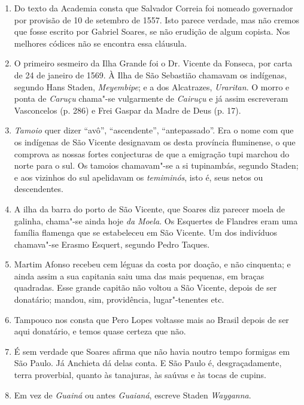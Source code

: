 \begin{enumerate}
\item Do texto da Academia consta que Salvador Correia foi nomeado governador por 
provisão de 10 de setembro de 1557. Isto parece verdade, mas não cremos que fosse 
escrito por Gabriel Soares, se não erudição de algum copista. Nos melhores códices 
não se encontra essa cláusula.

\item O primeiro sesmeiro da Ilha Grande foi o Dr. Vicente da Fonseca, por carta de 24 de 
janeiro de 1569.
À Ilha de São Sebastião chamavam os indígenas, segundo Hans Staden, \textit{Meyembipe}; 
e a dos Alcatrazes, \textit{Uraritan}.
O morro e ponta de \textit{Caruçu} chama"-se vulgarmente de \textit{Cairuçu} e já assim escreveram 
Vasconcelos (p. 286) e Frei Gaspar da Madre de Deus (p. 17).

\item  \textit{Tamoio} quer dizer ``avô'', ``ascendente'', ``antepassado''.  Era o nome
com que os indígenas de São Vicente designavam os desta província fluminense, 
o que comprova as nossas fortes conjecturas de que a emigração tupi marchou 
do norte para o sul. Os tamoios chamavam"-se a si tupinambás, segundo Staden; e 
aos vizinhos do sul apelidavam os \textit{temiminós}, isto é, seus netos ou descendentes.

\item  A ilha da barra do porto de São Vicente, que Soares diz parecer
moela de galinha, chama"-se ainda hoje \textit{da Moela}.
Os Esquertes de Flandres eram uma família flamenga que se estabeleceu em São 
Vicente. Um dos indivíduos chamava"-se Erasmo Esquert, segundo Pedro Taques.

\item Martim Afonso recebeu cem léguas da costa por doação, e não cinquenta; e ainda 
assim a sua capitania saiu uma das mais pequenas, em braças quadradas. Esse grande 
capitão não voltou a São Vicente, depois de ser donatário; mandou, sim, providência, 
lugar"-tenentes etc.

\item Tampouco nos consta que Pero Lopes voltasse mais ao Brasil depois de ser aqui 
donatário, e temos quase certeza que não.

\item É sem verdade que Soares afirma que não havia noutro tempo formigas em São 
Paulo. Já Anchieta dá delas conta. E São Paulo é, desgraçadamente, terra proverbial, 
quanto às tanajuras, às saúvas e às tocas de cupins.

\item Em vez de \textit{Guainá} ou antes \textit{Guaianá}, escreve Staden \textit{Wayganna}.


\end{enumerate}
